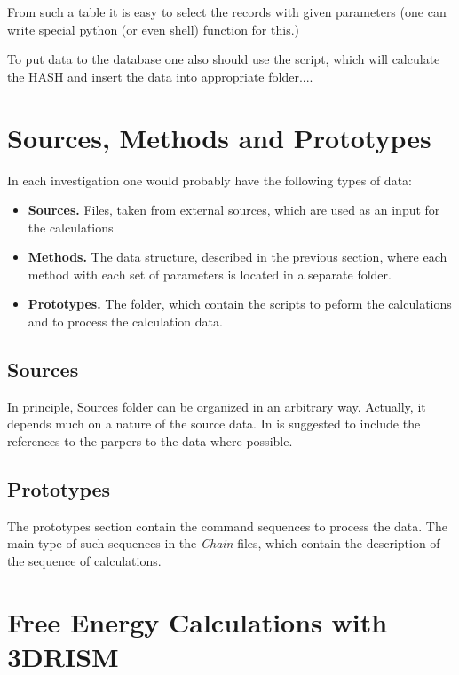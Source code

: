 \documentclass[12pt]{article}
\begin{document}
From such a table it is easy to select the records with given parameters (one can write special python (or even shell) function for this.)

To put data to the database one also should use the script, which will calculate the HASH and insert the data into appropriate folder.... 

\section{Sources, Methods and Prototypes}

In each investigation one would probably have the following types of data:
\begin{itemize}
\item  
\textbf{Sources.}
 Files, taken from external sources, which are used as an input for the calculations
 
 \item
 \textbf{Methods.}
The data structure, described in the previous section, where each method with each set of parameters is located in a separate folder.

\item
\textbf{Prototypes.}
The folder, which contain the scripts to peform the calculations and to process the calculation data.

\end{itemize}

\subsection{Sources}

In principle, Sources folder can be organized in an arbitrary way.
Actually, it depends much on a nature of the source data.
In is suggested to include the references to the parpers to the data where possible. 

\subsection{Prototypes}

The prototypes section contain the command sequences to process the data. 
The main type of such sequences in the \emph{Chain} files, which contain the description of the sequence of calculations.


\section{Free Energy Calculations with 3DRISM}
\end{document}
